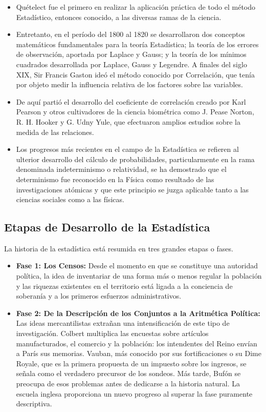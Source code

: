 \begin{itemize}
    \item Qu\'etelect fue el primero en realizar la aplicaci\'on pr\'actica de todo el m\'etodo Estad\'istico, entonces conocido, a las diversas ramas de la ciencia.
    \item Entretanto, en el per\'iodo del 1800 al 1820 se desarrollaron dos conceptos matem\'aticos fundamentales para la teor\'ia Estad\'istica; la teor\'ia de los errores de observaci\'on, aportada por Laplace y Gauss; y la teor\'ia de los m\'inimos cuadrados desarrollada por Laplace, Gauss y Legendre. A finales del siglo XIX, Sir Francis Gaston ide\'o el m\'etodo conocido por Correlaci\'on, que ten\'ia por objeto medir la influencia relativa de los factores sobre las variables.
    \item De aqu\'i parti\'o el desarrollo del coeficiente de correlaci\'on creado por Karl Pearson y otros cultivadores de la ciencia biom\'etrica como J. Pease Norton, R. H. Hooker y G. Udny Yule, que efectuaron amplios estudios sobre la medida de las relaciones.
    \item Los progresos m\'as recientes en el campo de la Estad\'istica se refieren al ulterior desarrollo del c\'alculo de probabilidades, particularmente en la rama denominada indeterminismo o relatividad, se ha demostrado que el determinismo fue reconocido en la F\'isica como resultado de las investigaciones at\'omicas y que este principio se juzga aplicable tanto a las ciencias sociales como a las f\'isicas.
\end{itemize}

\subsection{Etapas de Desarrollo de la Estad\'istica}

La historia de la estad\'istica est\'a resumida en tres grandes etapas o fases.

\begin{itemize}
    \item \textbf{Fase 1: Los Censos:} Desde el momento en que se constituye una autoridad pol\'itica, la idea de inventariar de una forma m\'as o menos regular la poblaci\'on y las riquezas existentes en el territorio est\'a ligada a la conciencia de soberan\'ia y a los primeros esfuerzos administrativos.
    \item \textbf{Fase 2: De la Descripci\'on de los Conjuntos a la Aritm\'etica Pol\'itica:} Las ideas mercantilistas extra\~nan una intensificaci\'on de este tipo de investigaci\'on. Colbert multiplica las encuestas sobre art\'iculos manufacturados, el comercio y la poblaci\'on: los intendentes del Reino env\'ian a Par\'is sus memorias. Vauban, m\'as conocido por sus fortificaciones o su Dime Royale, que es la primera propuesta de un impuesto sobre los ingresos, se se\~nala como el verdadero precursor de los sondeos. M\'as tarde, Buf\'on se preocupa de esos problemas antes de dedicarse a la historia natural. La escuela inglesa proporciona un nuevo progreso al superar la fase puramente descriptiva.
\end{itemize}

